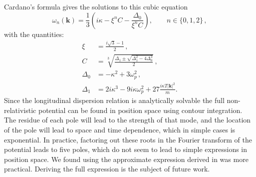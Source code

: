 Cardano's formula gives the solutions to this cubic equation
\begin{equation}\label{eq:cardano}
\omega_n(\boldsymbol{k}) = \frac{1}{3}\left(i\kappa-\xi^n C-\frac{\Delta_0}{\xi^n C}\right), \qquad n \in \{0,1,2\} \,,
\end{equation}
with the quantities:
\begin{align}\label{eq:delta}
  \xi &=\frac{i\sqrt{3}-1}{2}\,,\\
    C &= \sqrt[3]{\frac{\Delta_1 \pm \sqrt{\Delta_1^2 - 4 \Delta_0^3}}2}\,,\\
    \Delta_0 &= -\kappa^2 + 3 \omega_p^2\,,\\
\Delta_1 &= 2i\kappa^3 - 9 i\kappa \omega_p^2 + 27\frac{i\kappa T |\boldsymbol{k}|^2}{m}.
\end{align}
Since the longitudinal dispersion relation is analytically solvable the full non-relativistic potential can be found in position space using contour integration. The residue of each pole will lead to the strength of that mode, and the location of the pole will lead to space and time dependence, which in simple cases is exponential. In practice, factoring out these roots in the Fourier transform of the potential leads to five poles, which do not seem to lead to simple expressions in position space. We found using the approximate expression derived in  was more practical. Deriving the full expression is the subject of future work.




